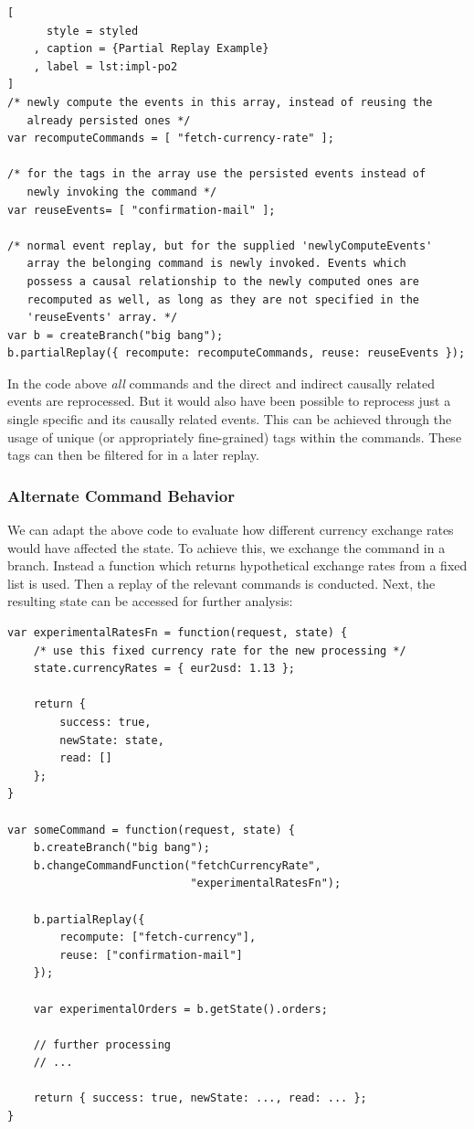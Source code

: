 \begin{lstlisting}[
	  style = styled 
	, caption = {Partial Replay Example}
	, label = lst:impl-po2
]
/* newly compute the events in this array, instead of reusing the 
   already persisted ones */
var recomputeCommands = [ "fetch-currency-rate" ];

/* for the tags in the array use the persisted events instead of 
   newly invoking the command */
var reuseEvents= [ "confirmation-mail" ];

/* normal event replay, but for the supplied 'newlyComputeEvents'
   array the belonging command is newly invoked. Events which
   possess a causal relationship to the newly computed ones are
   recomputed as well, as long as they are not specified in the
   'reuseEvents' array. */
var b = createBranch("big bang");
b.partialReplay({ recompute: recomputeCommands, reuse: reuseEvents });
\end{lstlisting}

In the code above \emph{all}  commands and the direct 
and indirect causally related events are reprocessed. 
But it would also have been possible to reprocess just a single specific 
 and its causally related events. 
This can be achieved through the usage of unique (or appropriately fine-grained)
tags within the commands. These tags can then be filtered for in a later replay.

\subsubsection{Alternate Command Behavior}
We can adapt the above code to evaluate how different currency exchange rates
would have affected the state. 
To achieve this, we exchange the  command in a branch. 
Instead a function which returns hypothetical exchange rates from a fixed list
is used. Then a replay of the relevant commands is conducted. Next, the resulting 
state can be accessed for further analysis:

\begin{lstlisting}[style=styled]
var experimentalRatesFn = function(request, state) {
	/* use this fixed currency rate for the new processing */
	state.currencyRates = { eur2usd: 1.13 };

	return { 
		success: true, 
		newState: state, 
		read: [] 
	};
}

var someCommand = function(request, state) {
	b.createBranch("big bang");
	b.changeCommandFunction("fetchCurrencyRate", 
	                        "experimentalRatesFn");
	
	b.partialReplay({ 
		recompute: ["fetch-currency"],
		reuse: ["confirmation-mail"]
	});

	var experimentalOrders = b.getState().orders;

	// further processing
	// ...

	return { success: true, newState: ..., read: ... };
}
\end{lstlisting}

